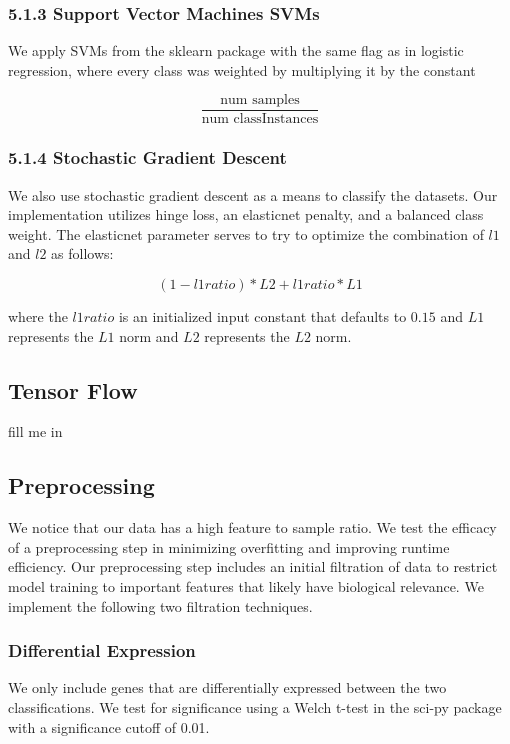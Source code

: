 \documentclass[12pt]{scrartcl}
\begin{document}
    \subsubsection*{5.1.3 Support Vector Machines SVMs}
    We apply SVMs from the sklearn package with the same flag as in logistic regression, where every class was weighted by multiplying it by the constant
    
    $$\frac{\textrm{num samples}}{\textrm{num classInstances}}$$
    
    \subsubsection*{5.1.4 Stochastic Gradient Descent}
    We also use stochastic gradient descent as a means to classify the datasets. Our implementation utilizes hinge loss, an elasticnet penalty, and a balanced class weight. The elasticnet parameter serves to try to optimize the combination of $l1$ and $l2$ as follows:
    
    $$(1-l1ratio)*L2 +l1ratio*L1$$
    
    where the $l1ratio$ is an initialized input constant that defaults to $0.15$ and $L1$ represents the $L1$ norm and $L2$ represents the $L2$ norm. 
    


    \subsection{Tensor Flow}
    fill me in

    \subsection{Preprocessing}
We notice that our data has a high feature to sample ratio. We test the efficacy of a preprocessing step in minimizing overfitting and improving runtime efficiency. Our preprocessing step includes an initial filtration of data to restrict model training to important features that likely have biological relevance. We implement the following two filtration techniques.

    \subsubsection{Differential Expression}
We only include genes that are differentially expressed between the two classifications. We test for significance using a Welch t-test in the sci-py package with a significance cutoff of 0.01. 
\end{document}
